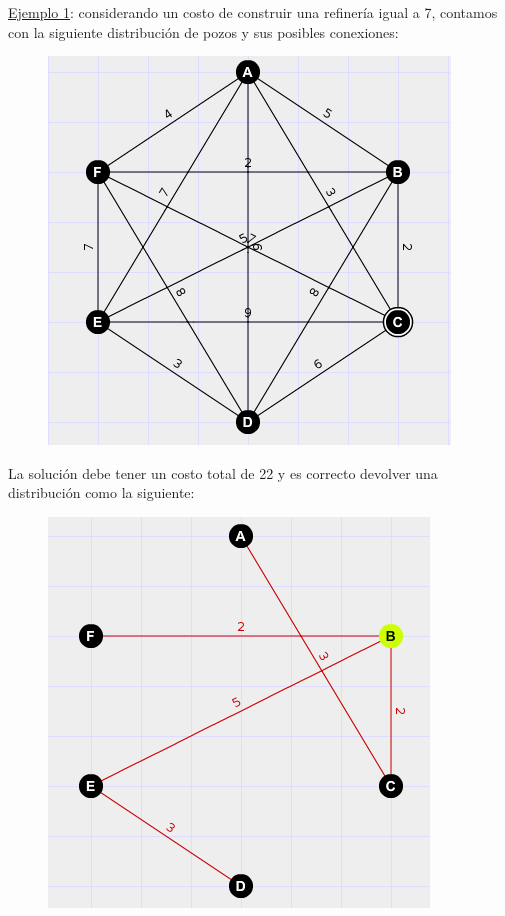 	\newpage
	
	\underline{Ejemplo 1}: considerando un costo de construir una refiner\'ia igual a 7, contamos con la siguiente distribuci\'on de pozos y sus posibles conexiones:
	


  \begin{figure}[h!]
   \begin{center}
 	\includegraphics[scale=0.7]{imagenes/ej3/cliqueBIEN.png}
   \end{center}
 \end{figure}


La soluci\'on debe tener un costo total de 22 y es correcto devolver una distribuci\'on como la siguiente:
  \begin{figure}[h!]
   \begin{center}
 	\includegraphics[scale=0.7]{imagenes/ej3/listoSIN.png}
   \end{center}
 \end{figure}

